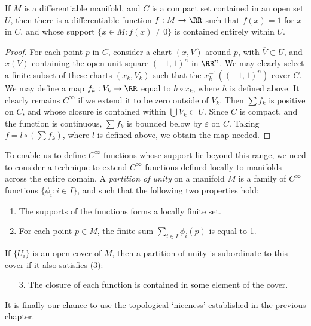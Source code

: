 \begin{theorem}
    If $M$ is a differentiable manifold, and $C$ is a compact set contained in an open set $U$, then there is a differentiable function $f:M \to \RR$ such that $f(x) = 1$ for $x$ in $C$, and whose support $\overline{\{ x \in M : f(x) \neq 0 \}}$ is contained entirely within $U$.
\end{theorem}
\begin{proof}
    For each point $p$ in $C$, consider a chart $(x,V)$ around $p$, with $\overline{V} \subset U$, and $x(V)$ containing the open unit square $(-1,1)^n$ in $\RR^n$. We may clearly select a finite subset of these charts $(x_k,V_k)$ such that the $x_k^{-1}((-1,1)^n)$ cover $C$. We may define a map $f_k:V_k \to \RR$ equal to $h \circ x_k$, where $h$ is defined above. It clearly remains $C^\infty$ if we extend it to be zero outside of $V_k$. Then $\sum f_k$ is positive on $C$, and whose closure is contained within $\bigcup \overline{V_k} \subset U$. Since $C$ is compact, and the function is continuous, $\sum f_k$ is bounded below by $\varepsilon$ on $C$. Taking $f = l \circ (\sum f_k)$, where $l$ is defined above, we obtain the map needed.
\end{proof}

To enable us to define $C^\infty$ functions whose support lie beyond this range, we need to consider a technique to extend $C^\infty$ functions defined locally to manifolds across the entire domain. A \emph{partition of unity} on a manifold $M$ is a family of $C^\infty$ functions $\{ \phi_i : i \in I \}$, and such that the following two properties hold:
%
\begin{enumerate}
    \item The supports of the functions forms a locally finite set.
    \item For each point $p \in M$, the finite sum $\sum_{i \in I} \phi_i(p)$ is equal to 1.
\end{enumerate}
%
If $\{ U_i \}$ is an open cover of $M$, then a partition of unity is subordinate to this cover if it also satisfies (3):
%
\begin{enumerate}
    \item[3.] The closure of each function is contained in some element of the cover.
\end{enumerate}
%
It is finally our chance to use the topological `niceness' established in the previous chapter.

